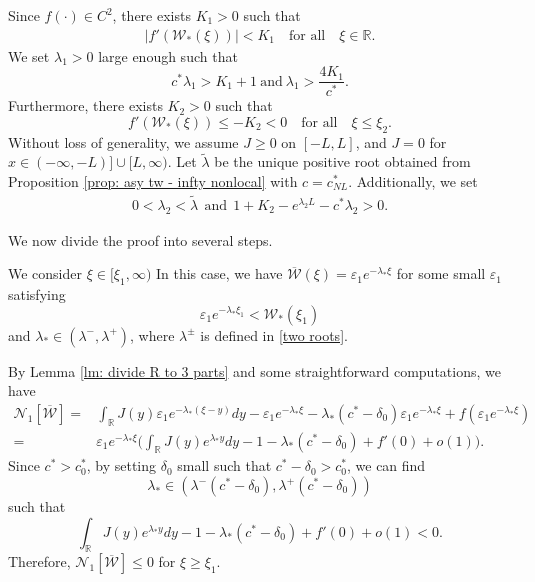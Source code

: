 \documentclass[11pt,a4paper]{article}
\numberwithin{equation}{section}
\numberwithin{figure}{section}
\newcommand\bea{\begin{eqnarray}}
\newcommand\eea{\end{eqnarray}}
\newcommand\beaa{\begin{eqnarray*}}
\newcommand\eeaa{\end{eqnarray*}}
\begin{document}
Since $f(\cdot)\in C^2$, there exists $K_1>0$  such that
\bea\label{K1K2 nonlocal pushed}
|f'({\mathcal{W}}_*(\xi))|< K_1\quad \mbox{for all}\quad\xi\in\mathbb{R}.
\eea
We set $\lambda_1>0$ %
large enough such that
\begin{equation}\label{condition on lambda 1 nonlocal pushed}
c^*\lambda_1>K_1+1\ \text{and}\ \lambda_1>\frac{4K_1}{c^*}.
\end{equation}
Furthermore, there exists $K_2>0$ such that
\begin{equation*}%
f'({\mathcal{W}}_*(\xi))\le -K_2<0\quad\text{for all}\quad\xi\le \xi_2.
\end{equation*}
Without loss of generality, we assume $J\ge0$ on $[-L,L]$, and $J=0$ for $x\in(-\infty,-L)]\cup[L,\infty)$.
Let $\tilde\lambda$ be the unique positive root obtained from Proposition \ref{prop: asy tw - infty nonlocal} with $c=c^*_{NL}$.
Additionally, we set
\beaa\label{lambda 2 nonlocal pushed}
0<\lambda_2<\tilde\lambda\ \ \text{and}\ \ 1+K_2-e^{\lambda_2L}-c^*\lambda_2>0.
\eeaa

We now divide the proof into several steps.
\medskip

 We consider $\xi\in[\xi_1,\infty)$ 
In this case, we have
$\overline{\mathcal{W}}(\xi)=\varepsilon_1e^{-\lambda_*\xi}$
for some small $\varepsilon_1$ satisfying 
\begin{equation}\label{varepsilon 1 pushed}
\varepsilon_1e^{-\lambda_*\xi_1}<\mathcal{W}_*(\xi_1)
\end{equation}
and $\lambda_*\in(\lambda^-,\lambda^+)$, where $\lambda^{\pm}$ is defined in \eqref{two roots}.

By Lemma \ref{lm: divide R to 3 parts} and some  straightforward computations,
we have
\begin{equation*}%
\begin{aligned}
\mathcal{N}_1[\overline{\mathcal{W}}]=&\int_{\mathbb{R}}J(y)\varepsilon_1e^{-\lambda_*(\xi-y)}dy-\varepsilon_1e^{-\lambda_*\xi}-\lambda_*(c^*-\delta_0)\varepsilon_1e^{-\lambda_*\xi}+f(\varepsilon_1e^{-\lambda_*\xi})\\
=&\varepsilon_1e^{-\lambda_*\xi}\Big(\int_{\mathbb{R}}J(y)e^{\lambda_*y}dy-1-\lambda_*(c^*-\delta_0)+f'(0)+o(1)\Big).
\end{aligned}
\end{equation*}
Since $c^*>c^*_0$, by setting $\delta_0$ small such that $c^*-\delta_0>c^*_0$, we can find 
$$\lambda_*\in(\lambda^-(c^*-\delta_0),\lambda^+(c^*-\delta_0))$$
such that
$$\int_{\mathbb{R}}J(y)e^{\lambda_*y}dy-1-\lambda_*(c^*-\delta_0)+f'(0)+o(1)<0.$$
Therefore, $\mathcal{N}_1[\overline{\mathcal{W}}]\leq 0$ for $\xi\ge \xi_1$.
\medskip
\end{document}
